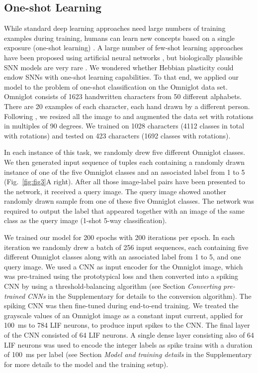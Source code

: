 \documentclass{article}
\begin{document}
\subsection*{One-shot Learning}
\label{sec:results-one_shot_learning}
While standard deep learning approaches need large numbers of training examples during training, humans can learn new concepts based on a single exposure (one-shot learning) \cite{lake2017building}. A large number of few-shot learning approaches have been proposed using artificial neural networks \cite{snell2017prototypical,finn2017model}, but biologically plausible SNN models are very rare \cite{scherr2020one}. We wondered whether Hebbian plasticity could endow SNNs with one-shot learning capabilities.   
To that end, we applied our model to the problem of one-shot classification on the Omniglot \cite{lake2015human} data set. Omniglot consists of \num{1623} handwritten characters from \num{50} different alphabets. There are \num{20} examples of each character, each hand drawn by a different person. Following \cite{vinyals2016matching}, we resized all the image to  and augmented the data set with rotations in multiples of \num{90} degrees. We trained on \num{1028} characters (\num{4112} classes in total with rotations) and tested on \num{423} characters (\num{1692} classes with rotations).

In each instance of this task, we randomly drew five different Omniglot classes. We then generated input sequence of tuples each containing a randomly drawn instance of one of the five Omniglot classes and an associated label from \num{1} to \num{5} (Fig.~\ref{fig:fig3}A right). After all those image-label pairs have been presented to the network, it received a query image. The query image showed another randomly drawn sample from one of these five Omniglot classes. The network was required to output the label that appeared together with an image of the same class as the query image (\num{1}-shot \num{5}-way classification).

We trained our model for \num{200} epochs with \num{200} iterations per epoch. In each iteration we randomly drew a batch of \num{256} input sequences, each containing five different Omniglot classes along with an associated label from \num{1} to \num{5}, and one query image. We used a \gls{CNN} as input encoder for the Omniglot image, which was pre-trained using the prototypical loss \cite{snell2017prototypical} and then converted into a spiking \gls{CNN} by using a threshold-balancing algorithm \cite{diehl2015fast,sengupta2019going} (see Section \emph{Converting pre-trained CNNs} in the Supplementary for details to the conversion algorithm). The spiking \gls{CNN} was then fine-tuned during end-to-end training. We treated the grayscale values of an Omniglot image as a constant input current, applied for \SI{100}{\ms} to \num{784} \gls{LIF} neurons, to produce input spikes to the \gls{CNN}. The final layer of the \gls{CNN} consisted of \num{64} \gls{LIF} neurons. A single dense layer consisting also of \num{64} \gls{LIF} neurons was used to encode the integer labels as spike trains with a duration of \SI{100}{\ms} per label (see Section \emph{Model and training details} in the Supplementary for more details to the model and the training setup).
\end{document}
